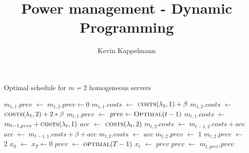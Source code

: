 \documentclass[hidelinks]{article}
\title{Power management - Dynamic Programming}
\author{Kevin Kappelmann\\
  \multicolumn{1}{p{.7\textwidth}}{\centering\emph{Chair for Theoretical Computer Science,\\
  Technical University of Munich}}}
\newcommand*\Let[2]{\State #1 $\gets$ #2}
\theoremstyle{plain}
\theoremstyle{definition}
\theoremstyle{rem}
\begin{document}

\begin{sloppypar}

\begin{algorithm}[H]
    \caption{Optimal schedule for $m=2$ homogeneous servers}
    \begin{algorithmic}[1]
        \Require{Convex cost function $f$, $\lambda_0=\lambda_T=0$, $\forall t\in[T-1]:\lambda_t\in(0,2]$}
	\EndIf

	\Let{$m_{1,1}.prev$}{$m_{1,2}.prev\leftarrow0$}
	\Let{$m_{1,1}.costs$}{$\Call{costs}{\lambda_1,1}+\beta$} 
	\Let{$m_{1,2}.costs$}{$\Call{costs}{\lambda_1,2}+2*\beta$} 
		\Let{$m_{t,1}.prev$}{$prev\leftarrow\Call{Optimal}{t-1}$} 
		\Let{$m_{t,1}.costs$}{$m_{t-1,prev}+\Call{costs}{\lambda_t,1}$}
		\Let{$acc$}{$\Call{costs}{\lambda_t,2}$} 
		\Let{$m_{t,2}.costs$}{$m_{t-1,2}.costs+acc$}
		\Let{$acc$}{$m_{t-1,1}.costs+\beta+acc$}
			\Let{$m_{t,2}.costs$}{$acc$}
			\Let{$m_{t,2}.prev$}{$1$}
		\Else
			\Let{$m_{t,2}.prev$}{$2$}
		\EndIf
	\EndFor
	\Let{$x_0$}{$x_T\leftarrow0$} 
	\Let{$prev$}{$\Call{optimal}{T-1}$}
		\Let{$x_t$}{$prev$}
		\Let{$prev$}{$m_{t,prev}.prev$}
	\EndFor
	\State {}
  \EndFunction
  \State
		\State {}
	\EndIf
	\State {}
  \EndFunction
  \State
		\State \Return{$\infty$} 
	\EndIf
	\State {}
  \EndFunction
  \end{algorithmic}
\end{algorithm}


\end{sloppypar}
\end{document}
